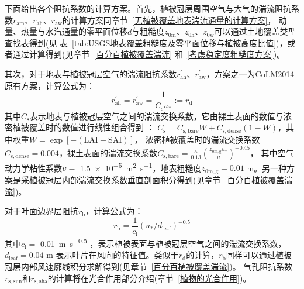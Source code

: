 下面给出各个阻抗系数的计算方案。首先，植被冠层周围空气与大气的湍流阻抗系数$r_{\mathrm{am}}$、$r_{\mathrm{ah}}$、$r_{\mathrm{aw}}$的计算方案同章节~\ref{无植被覆盖地表湍流通量的计算方案}，
动量、热量与水汽通量的零平面位移$d$与粗糙度$z_{\mathrm{0m}}$、$z_{\mathrm{0h}}$、$z_{\mathrm{0w}}$可以通过土地覆盖类型查找表得到(见
表~\ref{tab:USGS地表覆盖粗糙度及零平面位移与植被高度比值})，或者通过计算得到(见章节~\ref{百分百植被覆盖湍流} 和~\ref{考虑稳定度粗糙度方案})。

其次，对于地表与植被冠层空气的湍流阻抗系数$r_{\mathrm{ah}}^\prime$、$r_{\mathrm{aw}}^\prime$，方案之一为CoLM2014原有方案，计算公式为：
\begin{equation}
  r_{\mathrm{a h}}^{\prime}=r_{\mathrm{a w}}^{\prime}=\frac{1}{C_{\mathrm{s}} u_{*}}:=r_{\mathrm{d}}
\end{equation}
其中$C_{\mathrm {s}}$表示地表与植被冠层空气之间的湍流交换系数，它由裸土表面的数值与浓密植被覆盖时的数值进行线性组合得到 \citep{zeng2005vegetation}：
$C_{\mathrm {s}}=C_{\mathrm{s,bare}}W+C_{\mathrm{s,dense}}\left(1-W\right)$，其中权重$W=\exp {\left[-(\text{LAI}+\text{SAI})\right]}$，
浓密植被覆盖时的湍流交换系数$C_{\mathrm{s,dense}}=0.004$，裸土表面的湍流交换系数$C_{\mathrm{s,bare}}=\frac{\kappa}{0.13}\left(\frac{z_{\mathrm{0m,g}}u_\ast}{\upsilon}\right)^{-0.45}$，
其中空气动力学粘性系数$\upsilon=$ \qty{1.5e-5}{m^2.s^{-1}}，地表粗糙度$z_{\mathrm{0m,g}}=0.01$ {m}。另一种方案是采植被冠层内部湍流交换系数垂直剖面积分得到(见章节~\ref{百分百植被覆盖湍流})。

对于叶面边界层阻抗$r_{\mathrm {b}}$，计算公式为：
\begin{equation}
  r_{\mathrm{b}}=\frac{1}{c_{\mathrm{l}}}\left(u_{*} / d_{\mathrm{{leaf }}}\right)^{-0.5}
\end{equation}
其中$c_{\mathrm {l}}=$ \qty{0.01}{m.s^{-0.5}} ，表示植被表面与植被冠层空气之间的湍流交换系数，$d_{\mathrm{leaf}}=0.04$ m 表示叶片在风向的特征值。类似于$r_{\mathrm {d}}$的计算，$r_{\mathrm {b}}$同样可以通过植被冠层内部风速廓线积分求解得到(见章节~\ref{百分百植被覆盖湍流})。
气孔阻抗系数$r_{\mathrm{s,sun}}$和$r_{\mathrm{s,sha}}$的计算将在光合作用部分介绍(章节~\ref{植物的光合作用})。

